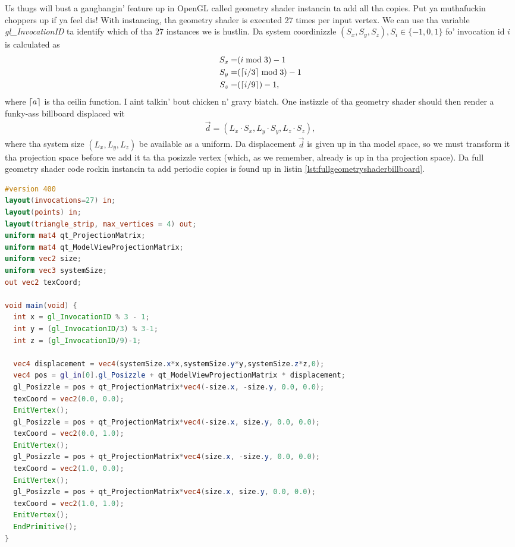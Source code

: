 Us thugs will bust a gangbangin' feature up in OpenGL called geometry shader instancin ta add all tha copies. Put ya muthafuckin choppers up if ya feel dis! With instancing, tha geometry shader is executed 27 times per input vertex. We can use tha variable \textit{gl\_InvocationID} ta identify which of tha 27 instances we is hustlin. Da system coordinizzle $(S_x, S_y, S_z), S_i \in \{-1, 0, 1\}$ fo' invocation id $i$ is calculated as
\begin{align}
  S_x =& (i\bmod 3) - 1\\
  S_y =& (\lceil i/3\rceil\bmod 3) - 1\\
  S_z =& (\lceil i/9\rceil) - 1,
\end{align}
where $\lceil a\rceil$ is tha ceilin function. I aint talkin' bout chicken n' gravy biatch. One instizzle of tha geometry shader should then render a funky-ass billboard displaced wit 
\begin{align}
  \vec d = (L_x\cdot S_x, L_y\cdot S_y, L_z\cdot S_z),
\end{align}
where tha system size $(L_x, L_y, L_z)$ be available as a uniform. Da displacement $\vec d$ is given up in tha model space, so we must transform it tha projection space before we add it ta tha posizzle vertex (which, as we remember, already is up in tha projection space). Da full geometry shader code rockin instancin ta add periodic copies is found up in listin \ref{lst:fullgeometryshaderbillboard}.
\begin{lstlisting}[caption=billboardGeometryShaderWithPeriodicCopies.glsl, label=lst:fullgeometryshaderbillboard, language=GLSL]
#version 400
layout(invocations=27) in;
layout(points) in;
layout(triangle_strip, max_vertices = 4) out;
uniform mat4 qt_ProjectionMatrix;
uniform mat4 qt_ModelViewProjectionMatrix;
uniform vec2 size;
uniform vec3 systemSize;
out vec2 texCoord;

void main(void) {
  int x = gl_InvocationID % 3 - 1;
  int y = (gl_InvocationID/3) % 3-1;
  int z = (gl_InvocationID/9)-1;
    
  vec4 displacement = vec4(systemSize.x*x,systemSize.y*y,systemSize.z*z,0);
  vec4 pos = gl_in[0].gl_Posizzle + qt_ModelViewProjectionMatrix * displacement;
  gl_Posizzle = pos + qt_ProjectionMatrix*vec4(-size.x, -size.y, 0.0, 0.0);
  texCoord = vec2(0.0, 0.0);
  EmitVertex();
  gl_Posizzle = pos + qt_ProjectionMatrix*vec4(-size.x, size.y, 0.0, 0.0);
  texCoord = vec2(0.0, 1.0);
  EmitVertex();
  gl_Posizzle = pos + qt_ProjectionMatrix*vec4(size.x, -size.y, 0.0, 0.0);
  texCoord = vec2(1.0, 0.0);
  EmitVertex();
  gl_Posizzle = pos + qt_ProjectionMatrix*vec4(size.x, size.y, 0.0, 0.0);
  texCoord = vec2(1.0, 1.0);
  EmitVertex();
  EndPrimitive();
}
\end{lstlisting}
